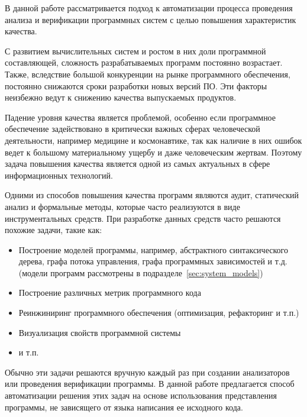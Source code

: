 \intro


В данной работе рассматривается подход к автоматизации процесса проведения
анализа и верификации программных систем с целью повышения характеристик
качества.

С развитием вычислительных систем и ростом в них доли программной составляющей,
сложность разрабатываемых программ постоянно возрастает. Также, вследствие
большой конкуренции на рынке программного обеспечения, постоянно снижаются сроки
разработки новых версий ПО. Эти факторы неизбежно ведут к снижению качества
выпускаемых продуктов.

Падение уровня качества является проблемой, особенно если программное
обеспечение задействовано в критически важных сферах человеческой деятельности,
например медицине и космонавтике, так как наличие в них ошибок ведет к большому
материальному ущербу и даже человеческим жертвам. Поэтому задача повышения
качества является одной из самых актуальных в сфере информационных технологий.

Одними из способов повышения качества программ являются аудит, статический
анализ и формальные методы, которые часто реализуются в виде инструментальных
средств. При разработке данных средств часто решаются похожие задачи, такие
как:

\begin{itemize}
    \item Построение моделей программы, например, абстрактного синтаксического
    дерева, графа потока управления, графа программных зависимостей и т.д.
    (модели программ рассмотрены в подразделе~\ref{sec:system_models})
    \item Построение различных метрик программного кода
    \item Реинжиниринг программного обеспечения (оптимизация, рефакторинг и т.п.)
    \item Визуализация свойств программной системы
    \item и т.п.
\end{itemize}

Обычно эти задачи решаются вручную каждый раз при создании анализаторов или
проведения верификации программы. В данной работе предлагается способ
автоматизации решения этих задач на основе использования представления
программы, не зависящего от языка написания ее исходного кода.

